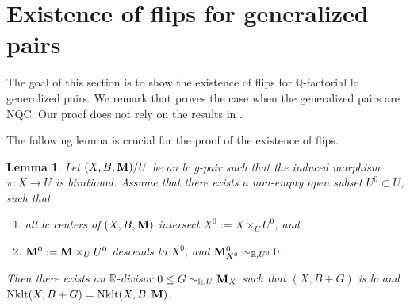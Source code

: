 \documentclass[11pt]{amsart}
\numberwithin{equation}{section}
\newcommand{\Mm}{{\bf{M}}}
\newcommand{\Qq}{\mathbb{Q}}
\newcommand{\Rr}{\mathbb{R}}
\newcommand{\Nklt}{\operatorname{Nklt}}
\newtheorem{lem}[thm]{Lemma}
\theoremstyle{definition}
\theoremstyle{definition}
\theoremstyle{definition}
\begin{document}
\section{Existence of flips for generalized pairs}\label{sec: eof gpair}

The goal of this section is to show the existence of flips for $\Qq$-factorial lc generalized pairs. We remark that  \cite[Theorem 1.2]{HL21a} proves the case when the generalized pairs are NQC. Our proof does not rely on the results in \cite{HL21a}.

The following lemma is crucial for the proof of the existence of flips.

\begin{lem}\label{lem: flip reduce special gpair to pair}
Let $(X,B,\Mm)/U$ be an lc g-pair such that the induced morphism $\pi: X\rightarrow U$ is birational. Assume that there exists a non-empty open subset $U^0\subset U$, such that
\begin{enumerate}
    \item all lc centers of $(X,B,\Mm)$ intersect $X^0:=X\times_U U^0$, and
    \item $\Mm^0:=\Mm\times_U U^0$ descends to $X^0$, and $\Mm^0_{X^0}\sim_{\Rr,U^0}0$.
\end{enumerate}
Then there exists an $\Rr$-divisor $0\leq G\sim _{\Rr,U}\Mm _X$ such that $(X,B+G)$ is lc and $\Nklt(X,B+G)=\Nklt(X,B,\Mm)$.
\end{lem}
\end{document}
